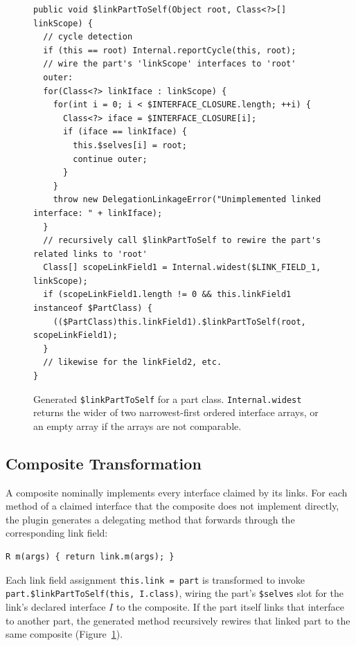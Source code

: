 \documentclass[acmsmall,screen,review,anonymous]{acmart}
\theoremstyle{acmplain}
\newcommand{\code}[1]{\texttt{#1}}
\begin{document}
\begin{figure}[H]
\begin{lstlisting}
public void $linkPartToSelf(Object root, Class<?>[] linkScope) {
  // cycle detection
  if (this == root) Internal.reportCycle(this, root);
  // wire the part's 'linkScope' interfaces to 'root'
  outer:
  for(Class<?> linkIface : linkScope) {
    for(int i = 0; i < $INTERFACE_CLOSURE.length; ++i) {
      Class<?> iface = $INTERFACE_CLOSURE[i];
      if (iface == linkIface) {
        this.$selves[i] = root;
        continue outer;
      }
    }
    throw new DelegationLinkageError("Unimplemented linked interface: " + linkIface);
  }
  // recursively call $linkPartToSelf to rewire the part's related links to 'root'
  Class[] scopeLinkField1 = Internal.widest($LINK_FIELD_1, linkScope);
  if (scopeLinkField1.length != 0 && this.linkField1 instanceof $PartClass) {
    (($PartClass)this.linkField1).$linkPartToSelf(root, scopeLinkField1);
  }
  // likewise for the linkField2, etc.
}
\end{lstlisting}
\caption{Generated \code{\$linkPartToSelf} for a part class. \code{Internal.widest} returns the wider of two narrowest-first
ordered interface arrays, or an empty array if the arrays are not comparable.}
\label{fig:linkPartToSelf-listing}
\end{figure}

\subsection{Composite Transformation}

A composite nominally implements every interface claimed by its links. For each method of a claimed interface that the composite
does not implement directly, the plugin generates a delegating method that forwards through the corresponding link field:

\begin{lstlisting}
R m(args) { return link.m(args); }
\end{lstlisting}

Each link field assignment \code{this.link = part} is transformed to invoke \code{part.\$linkPartToSelf(this, I.class)}, wiring the part's
\code{\$selves} slot for the link's declared interface $I$ to the composite. If the part itself links that interface to another part,
the generated method recursively rewires that linked part to the same composite (Figure~\ref{fig:linkPartToSelf-listing}).
\end{document}
